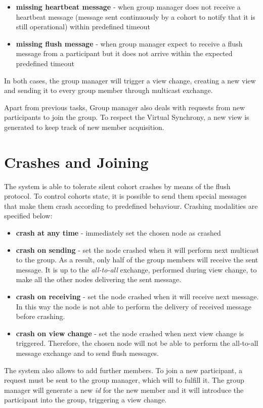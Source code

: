 \documentclass[11pt]{article}
\begin{document}
	\begin{itemize}
		\item \textbf{missing heartbeat message} - when group manager does not receive a heartbeat message (message sent continuously by a cohort to notify that it is still operational) within predefined timeout
		\item \textbf{missing flush message} - when group manager expect to receive a flush message from a participant but it does not arrive within the expected predefined timeout
	\end{itemize}
	In both cases, the group manager will trigger a view change, creating a new view and sending it to every group member through multicast exchange.
	
	Apart from previous tasks, Group manager also deals with requests from new participants to join the group. To respect the Virtual Synchrony, a new view is generated to keep track of new member acquisition.
	
	
	\section{Crashes and Joining}
	The system is able to tolerate silent cohort crashes by means of the flush protocol. To control cohorts state, it is possible to send them special messages that make them crash according to predefined behaviour. Crashing modalities are specified below:
	
	\begin{itemize}
		\item \textbf{crash at any time} - immediately set the chosen node as crashed
		\item \textbf{crash on sending} - set the node crashed when it will perform next multicast to the group. As a result, only half of the group members will receive the sent message. It is up to the \textit{all-to-all} exchange, performed during view change, to make all the other nodes delivering the sent message.
		\item \textbf{crash on receiving} - set the node crashed when it will receive next message. In this way the node is not able to perform the delivery of received message before crashing.
		\item \textbf{crash on view change} - set the node crashed when next view change is triggered. Therefore, the chosen node will not be able to perform the all-to-all message exchange and to send flush messages.
	\end{itemize}
	
	The system also allows to add further members. To join a new participant, a request must be sent to the group manager, which will to fulfill it. The group manager will generate a new \textit{id} for the new member and it will introduce the participant into the group, triggering a view change.
		
\end{document}
